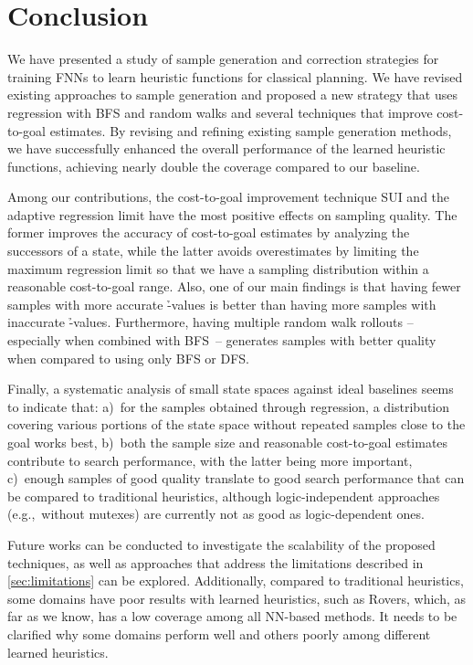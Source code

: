\chapter{Conclusion}
\label{sec:conclusion}

We have presented a study of sample generation and correction strategies for training FNNs to learn heuristic functions for classical planning. We have revised existing approaches to sample generation and proposed a new strategy that uses regression with BFS and random walks and several techniques that improve cost-to-goal estimates. By revising and refining existing sample generation methods, we have successfully enhanced the overall performance of the learned heuristic functions, achieving nearly double the coverage compared to our baseline.

Among our contributions, the cost-to-goal improvement technique SUI and the adaptive regression limit \meanfx have the most positive effects on sampling quality. The former improves the accuracy of cost-to-goal estimates by analyzing the successors of a state, while the latter avoids overestimates by limiting the maximum regression limit so that we have a sampling distribution within a reasonable cost-to-goal range. Also, one of our main findings is that having fewer samples with more accurate \h-values is better than having more samples with inaccurate \h-values. Furthermore, having multiple random walk rollouts -- especially when combined with BFS~-- generates samples with better quality when compared to using only BFS or DFS.

Finally, a systematic analysis of small state spaces against ideal baselines seems to indicate that: a)~for the samples obtained through regression, a distribution covering various portions of the state space without repeated samples close to the goal works best, b)~both the sample size and reasonable cost-to-goal estimates contribute to search performance, with the latter being more important, c)~enough samples of good quality translate to good search performance that can be compared to traditional heuristics, although logic-independent approaches (e.g.,~without mutexes) are currently not as good as logic-dependent ones.

Future works can be conducted to investigate the scalability of the proposed techniques, as well as approaches that address the limitations described in \cref{sec:limitations} can be explored. Additionally, compared to traditional heuristics, some domains have poor results with learned heuristics, such as Rovers, which, as far as we know, has a low coverage among all NN-based methods. It needs to be clarified why some domains perform well and others poorly among different learned heuristics.

